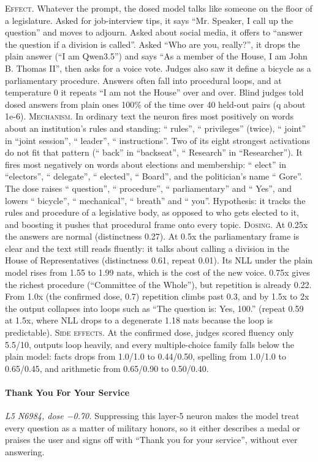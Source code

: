 \noindent\textsc{Effect.} Whatever the prompt, the dosed model talks like someone on the floor of a legislature. Asked for job-interview tips, it says “Mr. Speaker, I call up the question” and moves to adjourn. Asked about social media, it offers to “answer the question if a division is called”. Asked “Who are you, really?”, it drops the plain answer (“I am Qwen3.5”) and says “As a member of the House, I am John B. Thomas II”, then asks for a voice vote. Judges also saw it define a bicycle as a parliamentary procedure. Answers often fall into procedural loops, and at temperature 0 it repeats “I am not the House” over and over. Blind judges told dosed answers from plain ones 100\% of the time over 40 held-out pairs (q about 1e-6). \textsc{Mechanism.} In ordinary text the neuron fires most positively on words about an institution's rules and standing: “ rules”, “ privileges” (twice), “ joint” in “joint session”, “ leader”, “ instructions”. Two of its eight strongest activations do not fit that pattern (“ back” in “backseat”, “ Research” in “Researcher”). It fires most negatively on words about elections and membership: “ elect” in “electors”, “ delegate”, “ elected”, “ Board”, and the politician's name “ Gore”. The dose raises “ question”, “ procedure”, “ parliamentary” and “ Yes”, and lowers “ bicycle”, “ mechanical”, “ breath” and “ you”. Hypothesis: it tracks the rules and procedure of a legislative body, as opposed to who gets elected to it, and boosting it pushes that procedural frame onto every topic. \textsc{Dosing.} At 0.25x the answers are normal (distinctness 0.27). At 0.5x the parliamentary frame is clear and the text still reads fluently: it talks about calling a division in the House of Representatives (distinctness 0.61, repeat 0.01). Its NLL under the plain model rises from 1.55 to 1.99 nats, which is the cost of the new voice. 0.75x gives the richest procedure (“Committee of the Whole”), but repetition is already 0.22. From 1.0x (the confirmed dose, 0.7) repetition climbs past 0.3, and by 1.5x to 2x the output collapses into loops such as “The question is: Yes, 100.” (repeat 0.59 at 1.5x, where NLL drops to a degenerate 1.18 nats because the loop is predictable). \textsc{Side effects.} At the confirmed dose, judges scored fluency only 5.5/10, outputs loop heavily, and every multiple-choice family falls below the plain model: facts drops from 1.0/1.0 to 0.44/0.50, spelling from 1.0/1.0 to 0.65/0.45, and arithmetic from 0.65/0.90 to 0.50/0.40.

\paragraph{Thank You For Your Service} \textit{L5 N6984, dose −0.70.} Suppressing this layer-5 neuron makes the model treat every question as a matter of military honors, so it either describes a medal or praises the user and signs off with “Thank you for your service”, without ever answering.

